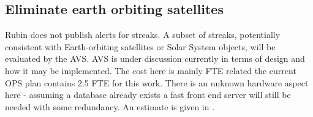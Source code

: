 
\subsection{Eliminate earth orbiting satellites} \label{sec:4eliminate}

Rubin does not publish alerts for streaks.
A subset of streaks, potentially consistent with Earth-orbiting satellites or Solar System objects, will be evaluated by the AVS.
AVS is under discussion currently in terms of design and how it may be implemented.
The cost here is mainly FTE related the current OPS plan contains 2.5 FTE for this work.
There is an unknown hardware aspect here - assuming a database already exists a fast front end server will still be needed with
some redundancy.
An estimate is given in .





